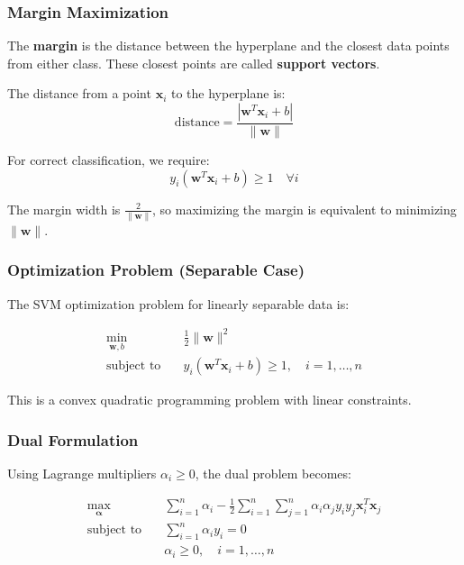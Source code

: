 \documentclass[12pt,a4paper]{article}
\begin{document}
\subsubsection{Margin Maximization}
The \textbf{margin} is the distance between the hyperplane and the closest data points from either class. These closest points are called \textbf{support vectors}.

The distance from a point $\mathbf{x}_i$ to the hyperplane is:
\begin{equation}
\text{distance} = \frac{|\mathbf{w}^T\mathbf{x}_i + b|}{\|\mathbf{w}\|}
\end{equation}

For correct classification, we require:
\begin{equation}
y_i(\mathbf{w}^T\mathbf{x}_i + b) \geq 1 \quad \forall i
\end{equation}

The margin width is $\frac{2}{\|\mathbf{w}\|}$, so maximizing the margin is equivalent to minimizing $\|\mathbf{w}\|$.

\subsubsection{Optimization Problem (Separable Case)}
The SVM optimization problem for linearly separable data is:

\begin{align}
\min_{\mathbf{w}, b} \quad &\frac{1}{2}\|\mathbf{w}\|^2 \\
\text{subject to} \quad &y_i(\mathbf{w}^T\mathbf{x}_i + b) \geq 1, \quad i = 1, \ldots, n
\end{align}

This is a convex quadratic programming problem with linear constraints.

\subsubsection{Dual Formulation}
Using Lagrange multipliers $\alpha_i \geq 0$, the dual problem becomes:

\begin{align}
\max_{\boldsymbol{\alpha}} \quad &\sum_{i=1}^n \alpha_i - \frac{1}{2}\sum_{i=1}^n\sum_{j=1}^n \alpha_i \alpha_j y_i y_j \mathbf{x}_i^T\mathbf{x}_j \\
\text{subject to} \quad &\sum_{i=1}^n \alpha_i y_i = 0 \\
&\alpha_i \geq 0, \quad i = 1, \ldots, n
\end{align}
\end{document}
